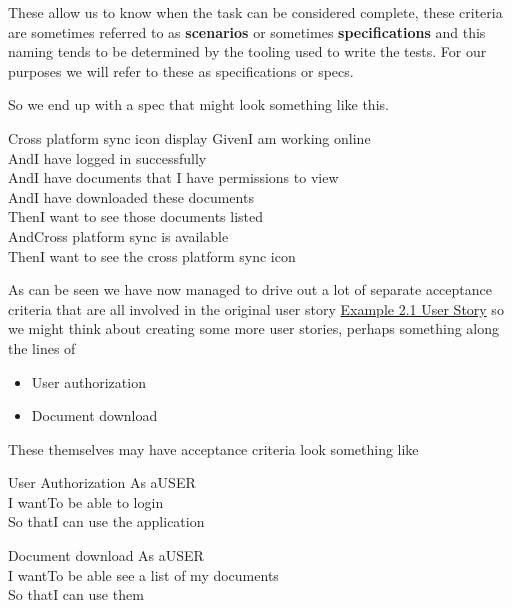 \documentclass[a4paper, titlepage]{article}
\begin{document}
  These allow us to know when the task can be considered
  complete, these criteria are sometimes referred to as
  \textbf{scenarios} or sometimes \textbf{specifications} and this
  naming tends to be determined by the tooling used to write the tests.
  For our purposes we will refer to these as specifications or specs.
  
  So we end up with a spec that might look something like this.

  \begin{tspec}{1}{Cross platform sync icon display}
      \ac{Given}{I am working online}\\
    \ac{And}{I have logged in successfully}\\
    \ac{And}{I have documents that I have permissions to view}\\
    \ac{And}{I have downloaded these documents}\\
    \ac{Then}{I want to see those documents listed}\\
    \ac{And}{Cross platform sync is available}\\
    \ac{Then}{I want to see the cross platform sync icon}\\
  \end{tspec}

  As can be seen we have now managed to drive out a lot of separate
  acceptance criteria that are all involved in the original user story \hyperref[Ex:User Story]{Example 2.1 User Story}
  so we might think about creating some more user stories, perhaps
  something along the lines of

  \begin{itemize}
    \item{User authorization}
    \item{Document download}
  \end{itemize}

  These themselves may have acceptance criteria look something like

  \begin{tspec}{1}{User Authorization}
    \ac{As a}{USER}\\
    \ac{I want}{To be able to login}\\
    \ac{So that}{I can use the application}
  \end{tspec}

  \begin{tspec}{1}{Document download}
    \ac{As a}{USER}\\
    \ac{I want}{To be able see a list of my documents}\\
    \ac{So that}{I can use them}\\
  \end{tspec}
\end{document}
